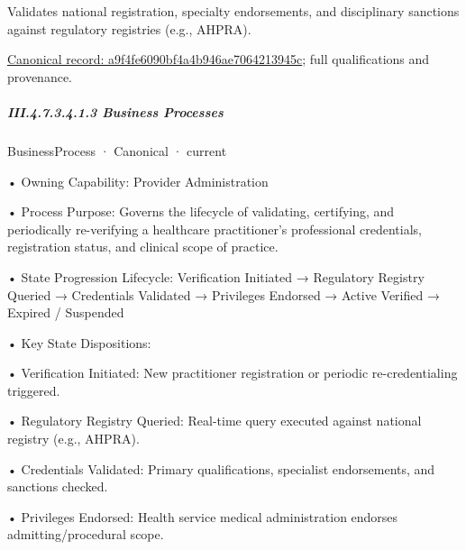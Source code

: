 Validates national registration, specialty endorsements, and disciplinary sanctions against regulatory registries (e.g., AHPRA).


{\footnotesize \href{../../../../../../../continuum/business/business-function/a9f4fe6090bf4a4b946ae7064213945c.md}{Canonical record: a9f4fe6090bf4a4b946ae7064213945c}; full qualifications and provenance.}\par
\subparagraph*{III.4.7.3.4.1.3 Business Processes}
\label{navigation:III.4.7.3.4.1.3}

\label{navigation:III.4.7.3.4.1.3.1}

\label{element:32a3e1f948474d3aa77ca71bfa515f58}
{\small BusinessProcess · Canonical · current}\par

•
Owning Capability: Provider Administration



•
Process Purpose: Governs the lifecycle of validating, certifying, and periodically re-verifying a healthcare practitioner's professional credentials, registration status, and clinical scope of practice.



•
State Progression Lifecycle: Verification Initiated → Regulatory Registry Queried → Credentials Validated → Privileges Endorsed → Active Verified → Expired / Suspended



•
Key State Dispositions:



•
Verification Initiated: New practitioner registration or periodic re-credentialing triggered.



•
Regulatory Registry Queried: Real-time query executed against national registry (e.g., AHPRA).



•
Credentials Validated: Primary qualifications, specialist endorsements, and sanctions checked.



•
Privileges Endorsed: Health service medical administration endorses admitting/procedural scope.



